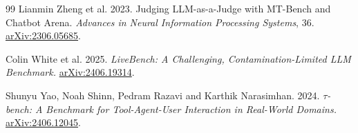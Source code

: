 {\begin{thebibliography}{99}
 Lianmin Zheng et al. 2023.
Judging LLM-as-a-Judge with MT-Bench and Chatbot Arena.
\emph{Advances in Neural Information Processing Systems}, 36.
\href{https://arxiv.org/abs/2306.05685}{arXiv:2306.05685}.

 Colin White et al. 2025.
\emph{LiveBench: A Challenging, Contamination-Limited LLM Benchmark.}
\href{https://arxiv.org/abs/2406.19314}{arXiv:2406.19314}.

 Shunyu Yao, Noah Shinn, Pedram Razavi and Karthik Narasimhan. 2024.
\emph{$\tau$-bench: A Benchmark for Tool-Agent-User Interaction in Real-World Domains.}
\href{https://arxiv.org/abs/2406.12045}{arXiv:2406.12045}.
\end{thebibliography}
}

